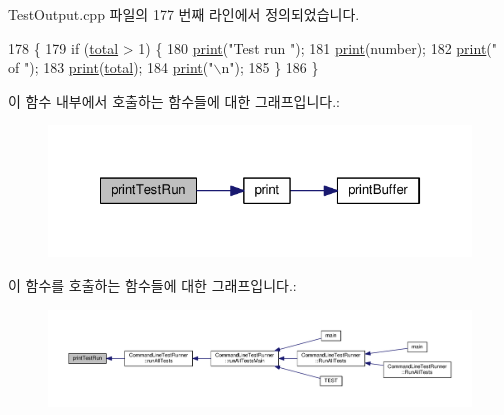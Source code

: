 Test\+Output.\+cpp 파일의 177 번째 라인에서 정의되었습니다.


\begin{DoxyCode}
178 \{
179     \textcolor{keywordflow}{if} (\hyperlink{test__intervals_8c_ac7af894858cf396a219d632f40afdc8d}{total} > 1) \{
180         \hyperlink{class_test_output_a321b5c489a90374cb61c34fe5d2253ef}{print}(\textcolor{stringliteral}{"Test run "});
181         \hyperlink{class_test_output_a321b5c489a90374cb61c34fe5d2253ef}{print}(number);
182         \hyperlink{class_test_output_a321b5c489a90374cb61c34fe5d2253ef}{print}(\textcolor{stringliteral}{" of "});
183         \hyperlink{class_test_output_a321b5c489a90374cb61c34fe5d2253ef}{print}(\hyperlink{test__intervals_8c_ac7af894858cf396a219d632f40afdc8d}{total});
184         \hyperlink{class_test_output_a321b5c489a90374cb61c34fe5d2253ef}{print}(\textcolor{stringliteral}{"\(\backslash\)n"});
185     \}
186 \}
\end{DoxyCode}


이 함수 내부에서 호출하는 함수들에 대한 그래프입니다.\+:
\nopagebreak
\begin{figure}[H]
\begin{center}
\leavevmode
\includegraphics[width=322pt]{class_test_output_a0cffc4628d21b0cd25649f9084927ca9_cgraph}
\end{center}
\end{figure}




이 함수를 호출하는 함수들에 대한 그래프입니다.\+:
\nopagebreak
\begin{figure}[H]
\begin{center}
\leavevmode
\includegraphics[width=350pt]{class_test_output_a0cffc4628d21b0cd25649f9084927ca9_icgraph}
\end{center}
\end{figure}


